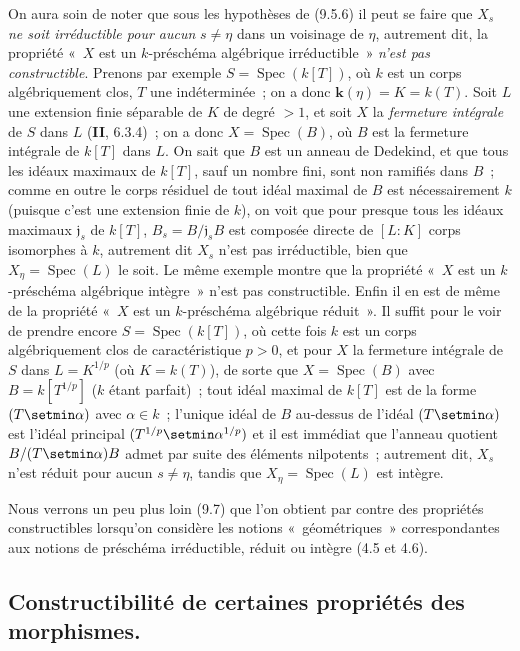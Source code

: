 \begin{remark}[9.5.7]
\label{IV.9.5.7-fr}
On aura soin de noter que sous les hypothèses de (9.5.6) il peut se faire que
$X_s$ \emph{ne soit irréductible pour aucun} $s\neq\eta$ dans un voisinage de
$\eta$, autrement dit, la propriété «~$X$ est un $k$-préschéma algébrique
irréductible~» \emph{n'est pas constructible}. Prenons par exemple
$S=\operatorname{Spec}(k[T])$, où $k$ est un corps algébriquement clos, $T$ une
indéterminée~; on a donc $\boldsymbol{k}(\eta)=K=k(T)$. Soit $L$ une extension finie
séparable de $K$ de degré $>1$, et soit $X$ la \emph{fermeture intégrale} de
$S$ dans $L$ (\textbf{II}, 6.3.4)~; on a donc $X=\operatorname{Spec}(B)$, où
$B$ est la fermeture intégrale de $k[T]$ dans $L$. On sait que $B$ est un
anneau de Dedekind, et que tous les idéaux maximaux de $k[T]$, sauf un nombre
fini, sont non ramifiés dans $B$~; comme en outre le corps résiduel de tout
idéal maximal de $B$ est nécessairement $k$ (puisque c'est une extension finie
de $k$), on voit que pour presque tous les idéaux maximaux $\mathfrak j_s$ de
$k[T]$, $B_s=B/\mathfrak j_sB$ est composée directe de $[L:K]$ corps isomorphes
à $k$, autrement dit $X_s$ n'est pas irréductible, bien que
$X_\eta=\operatorname{Spec}(L)$ le soit. Le même exemple montre que la
propriété «~$X$ est un $k$-préschéma algébrique intègre~» n'est pas
constructible. Enfin il en est de même de la propriété «~$X$ est un
$k$-préschéma algébrique réduit~». Il suffit pour le voir de prendre encore
$S=\operatorname{Spec}(k[T])$, où cette fois $k$ est un corps algébriquement
clos de caractéristique $p>0$, et pour $X$ la fermeture intégrale de $S$ dans
$L=K^{1/p}$ (où $K=k(T)$), de sorte que $X=\operatorname{Spec}(B)$ avec
$B=k[T^{1/p}]$ ($k$ étant parfait)~; tout idéal maximal de $k[T]$ est de la
forme $(T\setmin\alpha)$ avec $\alpha\in k$~; l'unique idéal de $B$ au-dessus de
l'idéal $(T\setmin\alpha)$ est l'idéal principal
$(T^{1/p}\setmin\alpha^{1/p})$ et il est immédiat
que l'anneau quotient $B/(T\setmin\alpha)B$ admet par suite des éléments nilpotents~;
autrement dit, $X_s$ n'est réduit pour aucun $s\neq\eta$, tandis que
$X_\eta=\operatorname{Spec}(L)$ est intègre.

Nous verrons un peu plus loin (9.7) que l'on obtient par contre des propriétés
constructibles lorsqu'on considère les notions «~géométriques~»
correspondantes aux notions de préschéma irréductible, réduit ou intègre (4.5
et 4.6).
\end{remark}

\subsection{Constructibilité de certaines propriétés des morphismes.}
\label{subsection:IV.9.6-fr}

